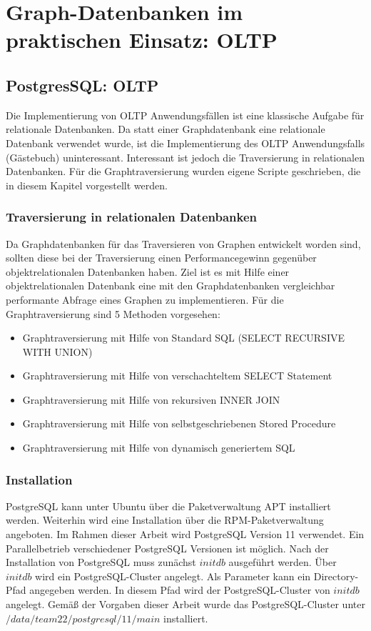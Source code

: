 \chapter{Graph-Datenbanken im praktischen Einsatz: \ac{OLTP}}
\section{PostgresSQL: OLTP}
Die Implementierung von OLTP Anwendungsfällen ist eine klassische Aufgabe für relationale Datenbanken.
Da statt einer Graphdatenbank eine relationale Datenbank verwendet wurde, ist die Implementierung des OLTP Anwendungsfalls (Gästebuch) uninteressant.
Interessant ist jedoch die Traversierung in relationalen Datenbanken.
Für die Graphtraversierung wurden eigene Scripte geschrieben, die in diesem Kapitel vorgestellt werden.
\subsection{Traversierung in relationalen Datenbanken}
Da Graphdatenbanken für das Traversieren von Graphen entwickelt worden sind, sollten diese bei der Traversierung einen Performancegewinn gegenüber objektrelationalen Datenbanken haben.
Ziel ist es mit Hilfe einer objektrelationalen Datenbank eine mit den Graphdatenbanken vergleichbar performante Abfrage eines Graphen zu implementieren.
Für die Graphtraversierung sind 5 Methoden vorgesehen:
\begin{itemize}
    \item Graphtraversierung mit Hilfe von Standard \ac{SQL} (SELECT RECURSIVE WITH UNION)
    \item Graphtraversierung mit Hilfe von verschachteltem SELECT Statement
    \item Graphtraversierung mit Hilfe von rekursiven INNER JOIN
    \item Graphtraversierung mit Hilfe von selbstgeschriebenen Stored Procedure
    \item Graphtraversierung mit Hilfe von dynamisch generiertem \ac{SQL}
\end{itemize}
\subsection{Installation}
PostgreSQL kann unter Ubuntu über die Paketverwaltung APT installiert werden. Weiterhin wird eine Installation über die RPM-Paketverwaltung angeboten. Im Rahmen dieser
Arbeit wird PostgreSQL Version 11 verwendet. Ein Parallelbetrieb verschiedener PostgreSQL Versionen ist möglich. Nach der Installation von PostgreSQL muss zunächst
$initdb$ ausgeführt werden. Über $initdb$ wird ein PostgreSQL-Cluster angelegt. Als Parameter kann ein Directory-Pfad angegeben werden.
In diesem Pfad wird der PostgreSQL-Cluster von $initdb$ angelegt. Gemäß der Vorgaben dieser Arbeit wurde das PostgreSQL-Cluster unter
$/data/team22/postgresql/11/main$ installiert.
